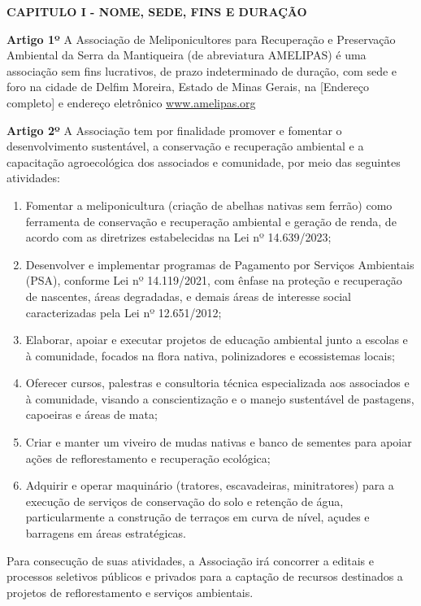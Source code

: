 \documentclass[12pt]{article}
\newcommand{\capitulo}[1]{\vspace{1.0em}\begin{center}\fontseries{b}\selectfont\textbf{\MakeUppercase{#1}}\end{center}}
\newcommand{\artigo}[1]{\vspace{1.0em}\noindent\textbf{#1}\hspace{0.75em}}
\newcommand{\paragrafo}[1]{\vspace{1.0em}\noindent{#1}\hspace{0.75em}}
\newcommand{\titulo}[1]{\begin{center}\fontsize{18}{22}\fontseries{b}\selectfont{#1\\[1.0em]}\end{center}}
\newcommand{\subtitulo}[1]{\begin{center}\fontsize{16}{17}\fontseries{m}\selectfont{#1\\[0.5em]}\end{center}}
\newcommand{\subsubtitulo}[1]{\begin{center}\fontsize{10}{12}\fontseries{m}\selectfont{#1\\[2.0em]}\end{center}}
\begin{document}
\titulo{ESTATUTO SOCIAL}
\subtitulo{Associação de Meliponicultores para Recuperação \\e Preservação Ambiental da Serra da Mantiqueira}\subsubtitulo{CNPJ 12.3456.789/0001-00}


\capitulo{Capitulo I - Nome, Sede, Fins e Duração}

\artigo{Artigo 1º} A Associação de Meliponicultores para Recuperação e Preservação Ambiental da Serra da Mantiqueira (de abreviatura AMELIPAS) é uma associação sem fins lucrativos, de prazo indeterminado de duração, com sede e foro na cidade de Delfim Moreira, Estado de Minas Gerais, na [Endereço completo] e endereço eletrônico \url{www.amelipas.org}

\artigo{Artigo 2º} A Associação tem por finalidade promover e fomentar o desenvolvimento sustentável, a conservação e recuperação ambiental e a capacitação agroecológica dos associados e comunidade, por meio das seguintes atividades:
\begin{enumerate}[label=\alph*)]
  \item Fomentar a meliponicultura (criação de abelhas nativas sem ferrão) como ferramenta de conservação e recuperação ambiental e geração de renda, de acordo com as diretrizes estabelecidas na Lei nº 14.639/2023;
  \item Desenvolver e implementar programas de Pagamento por Serviços Ambientais (PSA), conforme Lei nº 14.119/2021, com ênfase na proteção e recuperação de nascentes, áreas degradadas, e demais áreas de interesse social caracterizadas pela Lei nº 12.651/2012;
  \item Elaborar, apoiar e executar projetos de educação ambiental junto a escolas e à comunidade, focados na flora nativa, polinizadores e ecossistemas locais;
  \item Oferecer cursos, palestras e consultoria técnica especializada aos associados e à comunidade, visando a conscientização e o manejo sustentável de pastagens, capoeiras e áreas de mata;
  \item Criar e manter um viveiro de mudas nativas e banco de sementes para apoiar ações de reflorestamento e recuperação ecológica;
  \item Adquirir e operar maquinário (tratores, escavadeiras, minitratores) para a execução de serviços de conservação do solo e retenção de água, particularmente a construção de terraços em curva de nível, açudes e barragens em áreas estratégicas.
\end{enumerate}

\paragrafo{§ 1º} Para consecução de suas atividades, a Associação irá concorrer a editais e processos seletivos públicos e privados para a captação de recursos destinados a projetos de reflorestamento e serviços ambientais.
\end{document}
